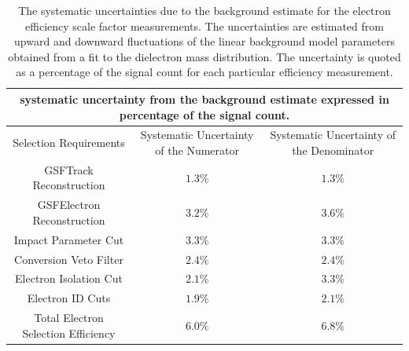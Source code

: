 \documentclass{cmspaper}
\begin{document}
\begin{table}[!ht]
\begin{center}
\begin{tabular}{|c|c|c|}
\hline
 \multicolumn{3}{|c|}{systematic uncertainty from the background estimate expressed in percentage of the signal count.} \\
\hline
 Selection Requirements & Systematic Uncertainty of the Numerator & Systematic Uncertainty of the Denominator  \\
\hline
\hline
 GSFTrack Reconstruction              & $ 1.3\%$  & $ 1.3\%$  \\
 GSFElectron Reconstruction           & $ 3.2\%$  & $ 3.6\%$  \\
 Impact Parameter Cut                 & $ 3.3\%$  & $ 3.3\%$  \\
 Conversion Veto Filter               & $ 2.4\%$  & $ 2.4\%$  \\
 Electron Isolation Cut               & $ 2.1\%$  & $ 3.3\%$  \\
 Electron ID Cuts                     & $ 1.9\%$  & $ 2.1\%$  \\
\hline                               
 Total Electron Selection Efficiency & $6.0\%$  & $6.8\% $  \\
\hline
\end{tabular}
\caption{The systematic uncertainties due to the background estimate for the electron efficiency scale factor measurements. The uncertainties are estimated from upward and downward fluctuations of the linear background model parameters obtained from a fit to the dielectron mass distribution. The uncertainty is quoted as a percentage of the signal count for each particular efficiency measurement. \label{tab:ElectronEfficiencySystematicsFromMassFit1InvPb}}
\end{center}
\end{table}
\end{document}
